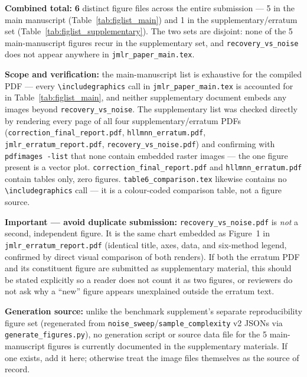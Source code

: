 \noindent\textbf{Combined total:} \textbf{6} distinct figure files across the
entire submission --- 5 in the main manuscript (Table~\ref{tab:figlist_main})
and 1 in the supplementary/erratum set (Table~\ref{tab:figlist_supplementary}).
The two sets are disjoint: none of the 5 main-manuscript figures recur in the
supplementary set, and \texttt{recovery\_vs\_noise} does not appear anywhere in
\texttt{jmlr\_paper\_main.tex}.

\noindent\textbf{Scope and verification:} the main-manuscript list is
exhaustive for the compiled PDF --- every \verb|\includegraphics| call in
\texttt{jmlr\_paper\_main.tex} is accounted for in
Table~\ref{tab:figlist_main}, and neither supplementary document embeds any
images beyond \texttt{recovery\_vs\_noise}. The supplementary list was checked
directly by rendering every page of all four supplementary/erratum PDFs
(\texttt{correction\_final\_report.pdf}, \texttt{hllmnn\_erratum.pdf},
\texttt{jmlr\_erratum\_report.pdf}, \texttt{recovery\_vs\_noise.pdf}) and
confirming with \texttt{pdfimages -list} that none contain embedded raster
images --- the one figure present is a vector plot.
\texttt{correction\_final\_report.pdf} and \texttt{hllmnn\_erratum.pdf}
contain tables only, zero figures. \texttt{table6\_comparison.tex} likewise
contains no \verb|\includegraphics| call --- it is a colour-coded comparison
table, not a figure source.

\noindent\textbf{Important --- avoid duplicate submission:}
\texttt{recovery\_vs\_noise.pdf} is \emph{not} a second, independent figure.
It is the same chart embedded as Figure~1 in \texttt{jmlr\_erratum\_report.pdf}
(identical title, axes, data, and six-method legend, confirmed by direct
visual comparison of both renders). If both the erratum PDF and its
constituent figure are submitted as supplementary material, this should be
stated explicitly so a reader does not count it as two figures, or reviewers
do not ask why a ``new'' figure appears unexplained outside the erratum text.

\noindent\textbf{Generation source:} unlike the benchmark supplement's
separate reproducibility figure set (regenerated from
\texttt{noise\_sweep}/\texttt{sample\_complexity} v2 JSONs via
\texttt{generate\_figures.py}), no generation script or source data file for
the 5 main-manuscript figures is currently documented in the supplementary
materials. If one exists, add it here; otherwise treat the image files
themselves as the source of record.

